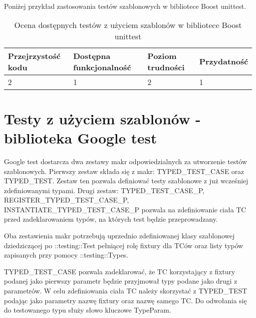 \documentclass[12pt,a4paper,notitlepage]{report}
\begin{document}
Poniżej przykład zastosowania testów szablonowych w bibliotece Boost unittest.

			

\begin{center}
			\begin{table}[!ht]
			\caption{Ocena dostępnych testów z użyciem szablonów w bibliotece Boost unittest}
			\label{}
			\begin{tabular}[!hc]{|l|l|l|l|}
		\hline
		Przejrzystość kodu 	&	Dostępna funkcjonalność	&	Poziom trudności	&	Przydatność \\ \hline
		2					&	1						&	2					& 	1  			\\ \hline
			\end{tabular}
			\end{table} 
		\end{center}

\section{Testy z użyciem szablonów - biblioteka Google test}

Google test dostarcza dwa zestawy makr odpowiedzialnych za utworzenie testów szablonowych.
Pierwszy zestaw składa się z makr: TYPED{\_}TEST{\_}CASE oraz TYPED{\_}TEST. Zestaw ten pozwala definiować testy szablonowe z już wcześniej zdefiniowanymi typami.
Drugi zestaw: TYPED{\_}TEST{\_}CASE{\_}P, REGISTER{\_}TYPED{\_}TEST{\_}CASE{\_}P, INSTANTIATE{\_}TYPED{\_}TEST{\_}CASE{\_}P pozwala na zdefiniowanie ciała TC przed zadeklarowaniem typów, na których test będzie przeprowadzany.

Oba zestawienia makr potrzebują uprzednio zdefiniowanej klasy szablonowej dziedziczącej po ::testing::Test pełniącej rolę fixtury dla TCów oraz listy typów zapisanych przy pomocy ::testing::Types.

TYPED{\_}TEST{\_}CASE pozwala zadeklarować, że TC korzystający z fixtury podanej jako pierwszy parametr będzie przyjmował typy podane jako drugi z parametrów. W celu zdefiniowania ciała TC należy skorzystać z TYPED{\_}TEST podając jako parametry nazwę fixtury oraz nazwę samego TC.
Do odwołania się do testowanego typu służy słowo kluczowe TypeParam.
\end{document}
